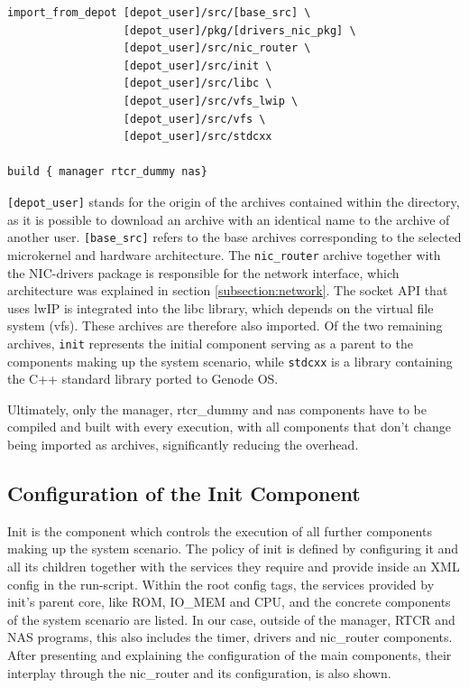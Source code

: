\begin{lstlisting}[caption={Importing of depot archives and subsequent building in manager.run.}]
import_from_depot [depot_user]/src/[base_src] \
                  [depot_user]/pkg/[drivers_nic_pkg] \
                  [depot_user]/src/nic_router \
                  [depot_user]/src/init \
                  [depot_user]/src/libc \
                  [depot_user]/src/vfs_lwip \
                  [depot_user]/src/vfs \
                  [depot_user]/src/stdcxx

build { manager rtcr_dummy nas}
\end{lstlisting}
\verb|[depot_user]| stands for the origin of the archives contained within the directory, as it is possible to download an archive with an identical name to the archive of another user. \verb|[base_src]| refers to the base archives corresponding to the selected microkernel and hardware architecture. The \verb|nic_router| archive together with the NIC-drivers package is responsible for the network interface, which architecture was explained in section \ref{subsection:network}. The socket API that uses lwIP is integrated into the libc library, which depends on the virtual file system (vfs). These archives are therefore also imported. Of the two remaining archives, \verb|init| represents the initial component serving as a parent to the components making up the system scenario, while \verb|stdcxx| is a library containing the C++ standard library ported to Genode OS.

Ultimately, only the manager, rtcr\_dummy and nas components have to be compiled and built with every execution, with all components that don't change being imported as archives, significantly reducing the overhead.
\subsection{Configuration of the Init Component}
Init is the component which controls the execution of all further components making up the system scenario. The policy of init is defined by configuring it and all its children together with the services they require and provide inside an XML config in the run-script. Within the root config tags, the services provided by init's parent core, like ROM, IO\_MEM and CPU, and the concrete components of the system scenario are listed. In our case, outside of the manager, RTCR and NAS programs, this also includes the timer, drivers and nic\_router components. After presenting and explaining the configuration of the main components, their interplay through the nic\_router and its configuration, is also shown. \cite{init_config}
